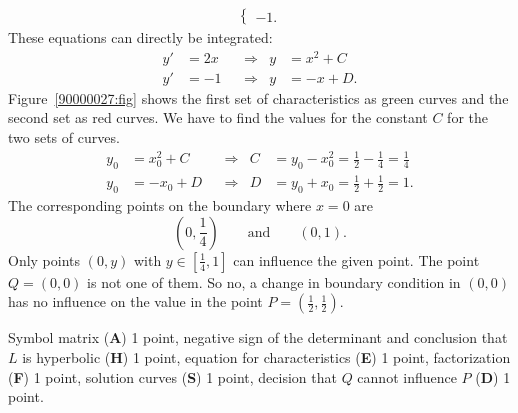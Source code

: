\begin{loesung}
\begin{teilaufgaben}
\begin{align*}
\begin{cases}
-1.
\end{cases}
\end{align*}
These equations can directly be integrated:
\[
\begin{aligned}
y'&=2x   &&\Rightarrow& y&= x^2 + C \\
y'&=-1   &&\Rightarrow& y&=-x   + D.
\end{aligned}
\]
Figure~\ref{90000027:fig} shows the first set of characteristics
as green curves and the second set as red curves.
We have to find the values for the constant $C$ for the two sets of
curves.
\[
\begin{aligned}
	y_0 &= x_0^2 + C         &
&\Rightarrow&
C &= y_0 - x_0^2 = \frac12-\frac14 = \frac{1}{4}\\
	y_0 &= -x_0 + D &
&\Rightarrow&
D &= y_0 + x_0 = \frac12 + \frac12 = 1.
\end{aligned}
\]
The corresponding points on the boundary where $x=0$ are
\[
(0,{\textstyle\frac14})
\qquad\text{and}\qquad
(0,1).
\]
Only points $(0,y)$ with $y\in[ \frac{1}{4}, 1]$ can
influence the given point.
The point $Q=(0,0)$ is not one of them.
So no, a change in boundary condition in $(0,0)$ has no influence on
the value in the point $P=(\frac12,\frac12)$.
\qedhere
\end{teilaufgaben}
\end{loesung}

\begin{bewertung}
Symbol matrix ({\bf A}) 1 point,
negative sign of the determinant and conclusion that $L$ is hyperbolic
({\bf H}) 1 point,
equation for characteristics ({\bf E}) 1 point,
factorization ({\bf F}) 1 point,
solution curves ({\bf S}) 1 point,
decision that $Q$ cannot influence $P$ ({\bf D}) 1 point.
\end{bewertung}

